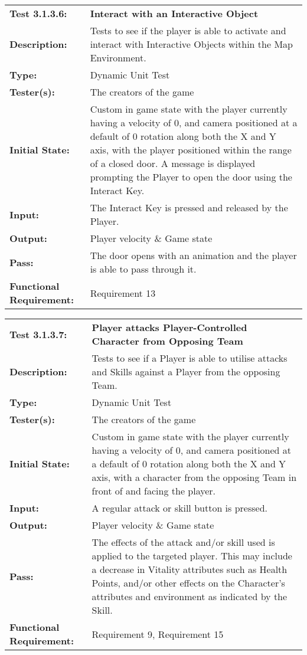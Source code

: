 \documentclass[12pt, titlepage]{article}
\begin{document}
\begin{mdframed}[linewidth=1pt]
\begin{tabularx}{\textwidth}{@{}p{3cm}X@{}}
{\bf Test 3.1.3.6:} & {\bf Interact with an Interactive Object}\\[\baselineskip]
{\bf Description:} & Tests to see if the player is able to activate and interact with Interactive Objects within the Map Environment. \\[0.5\baselineskip]
{\bf Type:} & Dynamic Unit Test\\[0.5\baselineskip]
{\bf Tester(s):} & The creators of the game\\[0.5\baselineskip]
{\bf Initial State:} & Custom in game state with the player currently having a velocity of 0, and camera positioned at a default of 0 rotation along both the X and Y axis, with the player positioned within the range of a closed door. A message is displayed prompting the Player to open the door using the Interact Key. \\[0.5\baselineskip]
{\bf Input:} & The Interact Key is pressed and released by the Player. \\[0.5\baselineskip]
{\bf Output:} & Player velocity \& Game state\\[0.5\baselineskip]
{\bf Pass:} & The door opens with an animation and the player is able to pass through it. \\[0.5\baselineskip]
{\bf Functional Requirement:} & Requirement 13
\end{tabularx}
\end{mdframed}

\begin{mdframed}[linewidth=1pt]
\begin{tabularx}{\textwidth}{@{}p{3cm}X@{}}
{\bf Test 3.1.3.7:} & {\bf Player attacks Player-Controlled Character from Opposing Team}\\[\baselineskip]
{\bf Description:} & Tests to see if a Player is able to utilise attacks and Skills against a Player from the opposing Team. \\[0.5\baselineskip]
{\bf Type:} & Dynamic Unit Test\\[0.5\baselineskip]
{\bf Tester(s):} & The creators of the game\\[0.5\baselineskip]
{\bf Initial State:} & Custom in game state with the player currently having a velocity of 0, and camera positioned at a default of 0 rotation along both the X and Y axis, with a character from the opposing Team in front of and facing the player. \\[0.5\baselineskip]
{\bf Input:} & A regular attack or skill button is pressed. \\[0.5\baselineskip]
{\bf Output:} & Player velocity \& Game state\\[0.5\baselineskip]
{\bf Pass:} & The effects of the attack and/or skill used is applied to the targeted player. This may include a decrease in Vitality attributes such as Health Points, and/or other effects on the Character's attributes and environment as indicated by the Skill.  \\[0.5\baselineskip]
{\bf Functional Requirement:} & Requirement 9, Requirement 15
\end{tabularx}
\end{mdframed}
\end{document}

